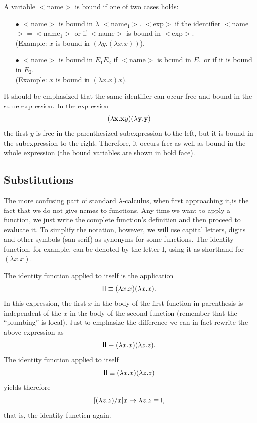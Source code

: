 \documentclass[12pt]{article}
\begin{document}
 A variable $<$name$>$ is bound if one of two cases holds:
\begin{itemize}
\item[$\bullet$]  $<$name$>$ is bound in $\lambda$ $<$name$_1>$. $<$exp$>$ if the identifier $<$name$>=$$<$name$_1>$ or if $<$name$>$ is bound in  $<$exp$>$.\\
(Example: $x$ is bound in $(\lambda y.(\lambda x.x))$).
\item[$\bullet$] $<$name$>$ is bound in $E_1E_2$ if $<$name$>$ is bound in $E_1$ or if it is bound in $E_2$.\\
(Example: $x$ is bound in $(\lambda x.x)x)$.
\end{itemize}
It should be emphasized that the same identifier can occur free and bound in the same expression. In the expression 
$$(\lambda {\bf x}.{\bf x}y)(\lambda {\bf y}.{\bf y})$$
 the first $y$ is free in the parenthesized subexpression to the left, but it is bound in the subexpression to the right. Therefore, it occurs free as well as bound in the whole expression (the bound variables are shown in bold face).
 
\subsection{Substitutions}

The more confusing part of standard $\lambda$-calculus, when first approaching it,is the fact that we do not give names to functions. Any time we want to apply a function, we just write the complete function's definition  and then proceed to evaluate it. To simplify the notation, however, we will use capital letters, digits and other symbols (san serif) as synonyms for some functions. The identity function, for example, can be denoted by the letter {\sf I}, using it as shorthand for $(\lambda x.x)$.

The identity function applied to itself is the application $${\sf I}{\sf I}\equiv (\lambda x.x)(\lambda x.x).$$ In this expression, the first $x$ in the body of the first function in parenthesis is independent of the $x$ in the body of the second function (remember that the ``plumbing'' is local). Just to emphasize the difference we can in fact rewrite the above expression as $${\sf I}{\sf I}\equiv (\lambda x.x)(\lambda z.z).$$  The identity function applied to itself $${\sf I}{\sf I}\equiv (\lambda x.x)(\lambda z.z)$$ yields therefore
$$[(\lambda z.z)/x]x\rightarrow\lambda z.z \equiv{\sf I},$$ that is, the identity function again.
\end{document}

